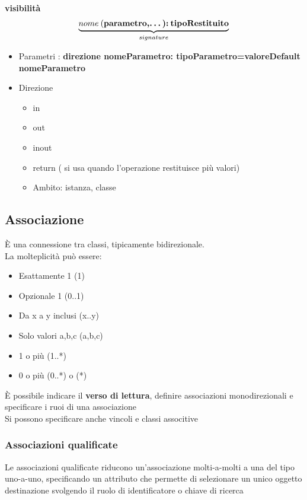 \documentclass{report}
\begin{document}
                \textbf{visibilità} $$\underbrace{nome\:(\textbf{parametro,\dots):}\:\textbf{tipoRestituito}}_{signature} $$ 
                \begin{itemize}
                    \item Parametri : \textbf{direzione nomeParametro: tipoParametro=valoreDefault} \textbf{nomeParametro}
                    \item Direzione
                        \begin{itemize}
                            \item in
                            \item out
                            \item inout
                            \item return ( si usa quando l'operazione restituisce più valori)
                    \item Ambito: istanza, classe
                        \end{itemize}
                \end{itemize}
            \subsection{Associazione}
                È una connessione tra classi, tipicamente bidirezionale.
                \\
                La molteplicità può essere:
                \begin{itemize}
                    \item Esattamente 1 (1)
                    \item Opzionale 1 (0..1)
                    \item Da x a y inclusi (x..y)
                    \item Solo valori a,b,c (a,b,c)
                    \item 1 o più (1..*)
                    \item 0 o più (0..*) o (*)
                \end{itemize}
                È possibile indicare il \textbf{verso di lettura}, definire associazioni monodirezionali e specificare i ruoi di una associazione 
                \\
                Si possono specificare anche vincoli e classi associtive 
                \subsubsection{Associazioni qualificate}
                    Le associazioni qualificate riducono un'associazione molti-a-molti a una del tipo uno-a-uno, specificando un attributo che permette di selezionare un unico oggetto destinazione svolgendo il ruolo di identificatore o chiave di ricerca 
\end{document}
